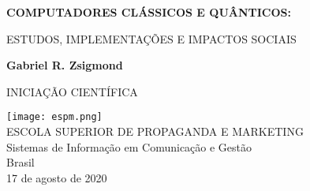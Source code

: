 \begin{titlepage}
    \begin{center}
        \vspace*{1cm}
        \LARGE
        \textbf{COMPUTADORES CLÁSSICOS E QUÂNTICOS:}
        
        \vspace{0.5cm}
        \large
        ESTUDOS, IMPLEMENTAÇÕES E IMPACTOS SOCIAIS
        
        \vspace{1.5cm}
        
        \textbf{Gabriel R. Zsigmond}
        \vfill
        
        INICIAÇÃO CIENTÍFICA
        
        \vspace{0.8cm}
        
        \texttt{[image: espm.png]}\\
        \large
        ESCOLA SUPERIOR DE PROPAGANDA E MARKETING\\
        Sistemas de Informação em Comunicação e Gestão\\
        Brasil\\
        17 de agosto de 2020\\
        
    \end{center}
\end{titlepage}